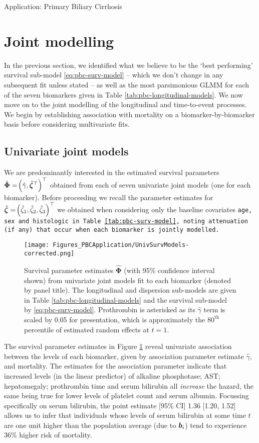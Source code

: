 \begin{chapter}{\label{cha:app-PBC}Application: Primary Biliary Cirrhosis}
  \section{Joint modelling}\label{sec:pbc-jointmodelling-parent}
  In the previous section, we identified what we believe to be the `best performing' survival sub-model \eqref{eq:pbc-surv-model} -- which we don't change in any subsequent fit unless stated -- as well as the most parsimonious GLMM for each of the seven biomarkers given in Table \ref{tab:pbc-longitudinal-models}. We now move on to the joint modelling of the longitudinal and time-to-event processes. We begin by establishing association with mortality on a biomarker-by-biomarker basis before considering multivariate fits.
  
  \subsection{Univariate joint models}\label{sec:pbc-jointmodelling-univs}
  We are predominantly interested in the estimated survival parameters $\hat{\bm{\Phi}}=\!\left(\hat{\gamma},\hat{\bm{\zeta}}^\top\right)^\top$ obtained from each of seven univariate joint models (one for each biomarker). Before proceeding we recall the parameter estimates for $\hat{\bm{\zeta}}=\!\left(\hat{\zeta}_1,\hat{\zeta}_2,\hat{\zeta}_3\right)^\top$ we obtained when considering only the baseline covariates \tt{age}, \tt{sex} and \tt{histologic} in Table \ref{tab:pbc-surv-model}, noting attenuation (if any) that occur when each biomarker is jointly modelled.
  
  \begin{figure}[ht]
      \centering
      \texttt{[image: Figures\_PBCApplication/UnivSurvModels-corrected.png]}
      \caption{Survival parameter estimates $\hat{\bm{\Phi}}$ (with 95\% confidence interval shown) from univariate joint models fit to each biomarker (denoted by panel title). The longitudinal and dispersion sub-models are given in Table \ref{tab:pbc-longitudinal-models} and the survival sub-model by \eqref{eq:pbc-surv-model}. Prothrombin is asterisked as its $\hat{\gamma}$ term is scaled by 0.05 for presentation, which is approximately the $80^{\mathrm{th}}$ percentile of estimated random effects at $t=1$.}
      \label{fig:pbc-univariate-survivals}
  \end{figure}

  The survival parameter estimates in Figure \ref{fig:pbc-univariate-survivals} reveal univariate association between the levels of each biomarker, given by association parameter estimate $\hat{\gamma}$, and mortality. The estimates for the association parameter indicate that increased levels (in the linear predictor) of alkaline phosphotase; AST; hepatomegaly; prothrombin time and serum bilirubin all \textit{increase} the hazard, the same being true for lower levels of platelet count and serum albumin. Focussing specifically on serum bilirubin, the point estimate [95\% CI] 1.36 [1.20, 1.52] allows us to infer that individuals whose levels of serum bilirubin at some time $t$ are one unit higher than the population average (\ie due to $\bm{b}_i$) tend to experience 36\% higher risk of mortality.


\end{chapter}
